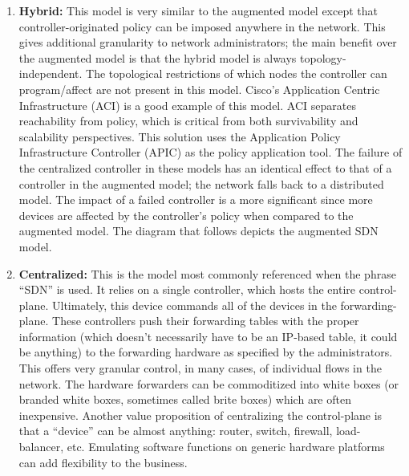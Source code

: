\begin{enumerate}

  \item \textbf{Hybrid:} This model is very similar to the augmented model
  except that controller-originated policy can be imposed anywhere in the
  network. This gives additional granularity to network administrators; the
  main benefit over the augmented model is that the hybrid model is always
  topology-independent. The topological restrictions of which nodes the
  controller can program/affect are not present in this model. Cisco’s
  Application Centric Infrastructure (ACI) is a good example of this model.
  ACI separates reachability from policy, which is critical from both
  survivability and scalability perspectives. This solution uses the
  Application Policy Infrastructure Controller (APIC) as the policy
  application tool. The failure of the centralized controller in these models
  has an identical effect to that of a controller in the augmented model; the
  network falls back to a distributed model. The impact of a failed controller
  is a more significant since more devices are affected by the controller’s
  policy when compared to the augmented model. The diagram that follows
  depicts the augmented SDN model.


  \item \textbf{Centralized:} This is the model most commonly referenced when
  the phrase ``SDN'' is used. It relies on a single controller, which hosts
  the entire control-plane. Ultimately, this device commands all of the
  devices in the forwarding-plane. These controllers push their forwarding
  tables with the proper information (which doesn’t necessarily have to be an
  IP-based table, it could be anything) to the forwarding hardware as
  specified by the administrators. This offers very granular control, in many
  cases, of individual flows in the network. The hardware forwarders can be
  commoditized into white boxes (or branded white boxes, sometimes called
  brite boxes) which are often inexpensive. Another value proposition of
  centralizing the control-plane is that a ``device'' can be almost anything:
  router, switch, firewall, load-balancer, etc. Emulating software functions
  on generic hardware platforms can add flexibility to the business.
  

\end{enumerate}

